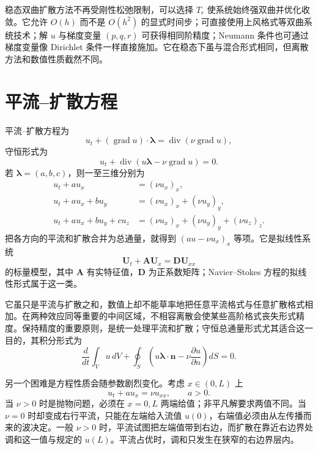 \documentclass[11pt,a4paper,openany,fontset=none]{ctexbook}
\begin{document}
稳态双曲扩散方法不再受刚性松弛限制，可以选择 $T_r$ 使系统始终强双曲并优化收敛。它允许 $O(h)$ 而不是 $O(h^2)$ 的显式时间步；可直接使用上风格式等双曲系统技术；解 $u$ 与梯度变量 $(p,q,r)$ 可获得相同阶精度；Neumann 条件也可通过梯度变量像 Dirichlet 条件一样直接施加。它在稳态下虽与混合形式相同，但离散方法和数值性质截然不同。

\section{平流--扩散方程}

平流--扩散方程为
\begin{equation}
 u_t+(\operatorname{grad}u)\cdot\bm\lambda=
 \operatorname{div}(\nu\operatorname{grad}u), \tag{2.6.1}
\end{equation}
守恒形式为
\begin{equation}
 u_t+\operatorname{div}(u\bm\lambda-\nu\operatorname{grad}u)=0. \tag{2.6.2}
\end{equation}
若 $\bm\lambda=(a,b,c)$，则一至三维分别为
\begin{align}
 u_t+a u_x&=(\nu u_x)_x, \tag{2.6.3}\\
 u_t+a u_x+b u_y&=(\nu u_x)_x+(\nu u_y)_y, \tag{2.6.4}\\
 u_t+a u_x+b u_y+c u_z&=(\nu u_x)_x+(\nu u_y)_y+(\nu u_z)_z. \tag{2.6.5}
\end{align}
把各方向的平流和扩散合并为总通量，就得到 $(au-\nu u_x)_x$ 等项。它是拟线性系统
\begin{equation}
 \bm U_t+\bm A\bm U_x=\bm D\bm U_{xx} \tag{2.6.9}
\end{equation}
的标量模型，其中 $\bm A$ 有实特征值，$\bm D$ 为正系数矩阵；Navier--Stokes 方程的拟线性形式属于这一类。

它虽只是平流与扩散之和，数值上却不能草率地把任意平流格式与任意扩散格式相加。在两种效应同等重要的中间区域，不相容离散会使某些高阶格式丧失形式精度。保持精度的重要原则，是统一处理平流和扩散；守恒总通量形式尤其适合这一目的，其积分形式为
\begin{equation}
 \frac{d}{dt}\int_Vu\,dV+\oint_S\left(u\bm\lambda\cdot\bm n-\nu\frac{\partial u}{\partial n}\right)dS=0. \tag{2.6.10}
\end{equation}

另一个困难是方程性质会随参数剧烈变化。考虑 $x\in(0,L)$ 上
\begin{equation}
 u_t+a u_x=\nu u_{xx},\qquad a>0. \tag{2.6.11}
\end{equation}
当 $\nu>0$ 时是抛物问题，必须在 $x=0,L$ 两端给值；非平凡解要求两值不同。当 $\nu=0$ 时却变成右行平流，只能在左端给入流值 $u(0)$，右端值必须由从左传播而来的波决定。一般 $\nu>0$ 时，平流试图把左端值带到右边，而扩散在靠近右边界处调和这一值与规定的 $u(L)$。平流占优时，调和只发生在狭窄的右边界层内。
\end{document}

